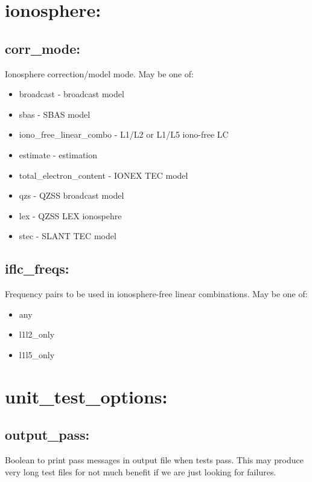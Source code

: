 \section{ionosphere:}

\subsection*{corr\_mode:}

Ionosphere correction/model mode. May be one of:

\begin{itemize}
\item broadcast - broadcast model
\item sbas - SBAS model
\item iono\_free\_linear\_combo - L1/L2 or L1/L5 iono-free LC
\item estimate -  estimation
\item total\_electron\_content - IONEX TEC model
\item qzs - QZSS broadcast model
\item lex - QZSS LEX ionospehre
\item stec - SLANT TEC model
\end{itemize}

\subsection*{iflc\_freqs:}

Frequency pairs to be used in ionosphere-free linear combinations. May be one of:


\begin{itemize}
\item any
\item l1l2\_only
\item l1l5\_only
\end{itemize}



\section{unit\_test\_options:}

\subsection*{output\_pass:}

Boolean to print pass messages in output file when tests pass. This may produce very long test files for not much benefit if we are just looking for failures.

